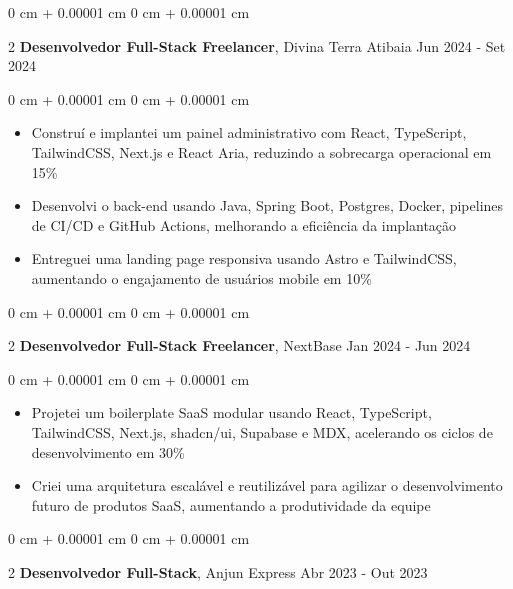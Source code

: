 \documentclass[10pt, letterpaper]{article}
\newenvironment{highlights}{ \begin{itemize}[ topsep=0.10 cm, parsep=0.10 cm, partopsep=0pt,
itemsep=0pt, leftmargin=0 cm + 10pt ] }{ \end{itemize} } %
\newenvironment{onecolentry}{ \begin{adjustwidth}{ 0 cm + 0.00001 cm }{ 0 cm + 0.00001 cm }
}{ \end{adjustwidth} } %
\newenvironment{twocolentry}[2][]{ \onecolentry \def\secondColumn{#2} \setcolumnwidth{\fill, 4.5 cm}
\begin{paracol}{2} }{ \switchcolumn \raggedleft \secondColumn \end{paracol}
\endonecolentry } %
\begin{document}
	\vspace{0.2 cm}

	\begin{twocolentry}
		{ Jun 2024 - Set 2024 } \textbf{Desenvolvedor Full-Stack Freelancer}, Divina Terra Atibaia
	\end{twocolentry}

	\vspace{0.10 cm}
	\begin{onecolentry}
		\begin{highlights}
			\item Construí e implantei um painel administrativo com React, TypeScript, TailwindCSS, Next.js e React Aria, reduzindo a sobrecarga operacional em 15\%
			\item Desenvolvi o back-end usando Java, Spring Boot, Postgres, Docker, pipelines de CI/CD e GitHub Actions, melhorando a eficiência da implantação
			\item Entreguei uma landing page responsiva usando Astro e TailwindCSS, aumentando o engajamento de usuários mobile em 10\%
		\end{highlights}
	\end{onecolentry}

	\vspace{0.2 cm}

	\begin{twocolentry}
		{ Jan 2024 - Jun 2024 } \textbf{Desenvolvedor Full-Stack Freelancer}, NextBase
	\end{twocolentry}

	\vspace{0.10 cm}
	\begin{onecolentry}
		\begin{highlights}
			\item Projetei um boilerplate SaaS modular usando React, TypeScript, TailwindCSS, Next.js, shadcn/ui, Supabase e MDX, acelerando os ciclos de desenvolvimento em 30\%
			\item Criei uma arquitetura escalável e reutilizável para agilizar o desenvolvimento futuro de produtos SaaS, aumentando a produtividade da equipe
		\end{highlights}
	\end{onecolentry}

	\vspace{0.2 cm}

	\begin{twocolentry}
		{ Abr 2023 - Out 2023 } \textbf{Desenvolvedor Full-Stack}, Anjun Express
	\end{twocolentry}
\end{document}

